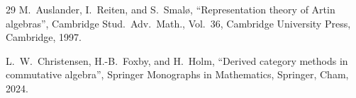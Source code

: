 \documentclass[12pt,reqno]{amsart}
\numberwithin{equation}{section}
\theoremstyle{definition}
\theoremstyle{theorem}
\theoremstyle{definition}
\begin{document}
\begin{thebibliography}{29}
  M.\ Auslander, I.\ Reiten, and S.\ Smal\o, ``Representation theory of Artin algebras'', Cambridge Stud.\ Adv.\ Math., Vol.\ 36, Cambridge University Press, Cambridge, 1997.




%




%

  L.\ W.\ Christensen, H.-B.\ Foxby, and H.\ Holm, ``Derived category methods in commutative algebra'', Springer Monographs in Mathematics, Springer, Cham, 2024.



\end{thebibliography}
\end{document}
